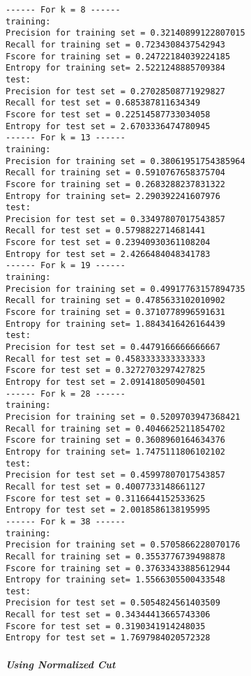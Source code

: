 \documentclass[11pt]{article}
\begin{document}
    \begin{Verbatim}[commandchars=\\\{\}]
------ For k = 8 ------
training:
Precision for training set = 0.32140899122807015
Recall for training set = 0.7234308437542943
Fscore for training set = 0.24722184039224185
Entropy for training set= 2.5221248885709384
test:
Precision for test set = 0.27028508771929827
Recall for test set = 0.685387811634349
Fscore for test set = 0.22514587733034058
Entropy for test set = 2.6703336474780945
------ For k = 13 ------
training:
Precision for training set = 0.38061951754385964
Recall for training set = 0.5910767658375704
Fscore for training set = 0.2683288237831322
Entropy for training set= 2.290392241607976
test:
Precision for test set = 0.33497807017543857
Recall for test set = 0.5798822714681441
Fscore for test set = 0.23940930361108204
Entropy for test set = 2.4266484048341783
------ For k = 19 ------
training:
Precision for training set = 0.49917763157894735
Recall for training set = 0.4785633102010902
Fscore for training set = 0.3710778996591631
Entropy for training set= 1.8843416426164439
test:
Precision for test set = 0.4479166666666667
Recall for test set = 0.4583333333333333
Fscore for test set = 0.3272703297427825
Entropy for test set = 2.091418050904501
------ For k = 28 ------
training:
Precision for training set = 0.5209703947368421
Recall for training set = 0.4046625211854702
Fscore for training set = 0.3608960164634376
Entropy for training set= 1.7475111806102102
test:
Precision for test set = 0.45997807017543857
Recall for test set = 0.4007733148661127
Fscore for test set = 0.3116644152533625
Entropy for test set = 2.0018586138195995
------ For k = 38 ------
training:
Precision for training set = 0.5705866228070176
Recall for training set = 0.3553776739498878
Fscore for training set = 0.37633433885612944
Entropy for training set= 1.5566305500433548
test:
Precision for test set = 0.5054824561403509
Recall for test set = 0.34344413665743306
Fscore for test set = 0.3190341914248035
Entropy for test set = 1.7697984020572328
    \end{Verbatim}

    \subparagraph{Using Normalized Cut}\label{using-normalized-cut}
\end{document}
